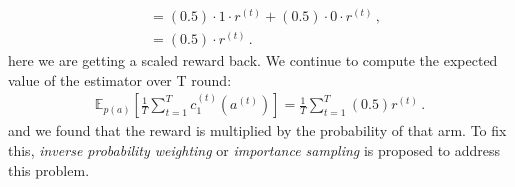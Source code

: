 \documentclass[11pt]{article}
\begin{document}
\begin{itemize}
\begin{align}
        &= (0.5) \cdot 1 \cdot r^{(t)} + (0.5) \cdot 0 \cdot r^{(t)}\, , \nonumber \\
        &= (0.5) \cdot r^{(t)}\, .
        \label{eq:reward_half}
    \end{align}
    here we are getting a scaled reward back. We continue to compute the expected value of the estimator over T round:
    \begin{align*}
        \mathbb{E}_{p(a)} \left[ \frac{1}{T} \sum_{t=1}^{T} c_1^{(t)} (a^{(t)}) \right] = \frac{1}{T} \sum_{t=1}^{T} (0.5) r^{(t)}\, .
    \end{align*}
    and we found that the reward is multiplied by the probability of that arm. To fix this, \textit{inverse probability weighting} or \textit{importance sampling} is proposed to address this problem.
\end{itemize}
\end{document}
